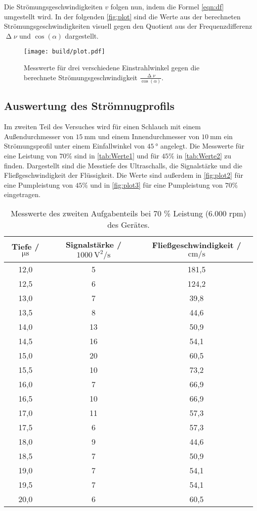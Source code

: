 \noindent
Die Strömungsgeschwindigkeiten $v$ folgen nun, indem die Formel \eqref{eqn:df} umgestellt wird. In der folgenden \autoref{fig:plot} sind die Werte aus der 
berechneten Strömungsgeschwindigkeiten visuell gegen den Quotient aus der Frequenzdifferenz $\upDelta \nu$ und $\cos(\alpha)$ dargestellt.
\begin{figure}[H]
  \centering
  \texttt{[image: build/plot.pdf]}
  \caption{Messwerte für drei verschiedene Einstrahlwinkel gegen die berechnete Strömungsgeschwindigkeit $\frac{\upDelta\nu}{\cos(\alpha)}$.}
  \label{fig:plot}
\end{figure}

\subsection{Auswertung des Strömnugprofils}
\label{subsec:StroemiProf}
Im zweiten Teil des Versuches wird für einen Schlauch mit einem Außendurchmesser von $\SI{15}{\milli\meter}$ und einem Innendurchmesser von $\SI{10}{\milli\metre}$ ein
Strömungsprofil unter einem Einfallwinkel von $\SI{45}{\degree}$ angelegt. Die Messwerte für eine Leistung von $70\%$ sind in \autoref{tab:Werte1} und für $45\%$ in 
\autoref{tab:Werte2} zu finden. Dargestellt sind die Messtiefe des Ultraschalls, die Signalstärke und die Fließgeschwindigkeit der Flüssigkeit.
Die Werte sind außerdem in \autoref{fig:plot2} für eine Pumpleistung von $45 \%$ und in \autoref{fig:plot3} für eine Pumpleistung von $70 \%$ eingetragen.
\begin{table}[H]
  \centering
  \caption{Messwerte des zweiten Aufgabenteils bei 70 \% Leistung (6.000 rpm) des Gerätes.}
  \label{tab:Werte1}
  \begin{tabular}{c c c}
    \toprule
    Tiefe / $\si{\micro\second}$ & Signalstärke / $\SI{1000}{\square\volt\per\second}$ & Fließgeschwindigkeit / $\si{\centi\meter\per\second}$ \\
    \midrule
    12,0 & 5 & 181,5 \\
    12,5 & 6 & 124,2 \\
    13,0 & 7 & 39,8 \\
    13,5 & 8 & 44,6 \\
    14,0 & 13 & 50,9 \\
    14,5 & 16 & 54,1 \\
    15,0 & 20  & 60,5 \\
    15,5 & 10 & 73,2 \\
    16,0 & 7 & 66,9 \\
    16,5 & 10 & 66,9 \\
    17,0 & 11 & 57,3 \\
    17,5 & 6 & 57,3 \\
    18,0 & 9 & 44,6 \\
    18,5 & 7 & 50,9 \\
    19,0 & 7 & 54,1 \\
    19,5 & 7 & 54,1 \\
    20,0 & 6 & 60,5 \\
    \bottomrule
  \end{tabular}
\end{table}

